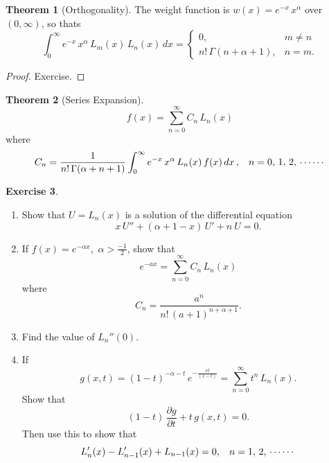 \documentclass[12pt,a4paper]{report}
\theoremstyle{definition}
\newtheorem{thm}{Theorem}[section]
\newtheorem{exe}[thm]{Exercise}
\theoremstyle{plain}
\begin{document}
\begin{thm}[Orthogonality]
The weight function is $w(x) = e^{-x}\, x^{\alpha}$ over $(0,\infty)$, so thats
$$\int_0^{\infty}e^{-x}\, x^{\alpha}\, L_m(x)\, L_n(x)\, dx = \begin{cases}
                                                               0, & m\neq n\\
                                                               n!\, \Gamma(n + \alpha + 1), & n= m.
                                                             \end{cases}$$
\end{thm}

\begin{proof}
Exercise.
\end{proof}







\begin{thm}[Series Expansion]
$$f(x) = \sum_{n=0}^{\infty} C_n\, L_n(x)$$ where $$C_n = \frac{1}{n!\, \Gamma(\alpha + n + 1)}\int_0^{\infty}e^{-x}\, x^{\alpha}\, L_n(x)\, f(x)\, dx\, , \hspace{0.3cm} n=0, \, 1,\, 2, \, \cdots\cdots$$
\end{thm}






\begin{exe}
\begin{enumerate}
\item[(a).] Show that  $U = L_n(x)$ is a solution of the differential equation $$x\, U'' + (\alpha+ 1 - x)\, U' + n\ U = 0.$$
\item[(b).] If $f(x) = e^{-\alpha x}$, $\, \alpha >\frac{-1}{2}$, show that 
$$e^{-a x} = \sum_{n=0}^{\infty} C_n\, L_n(x)$$ where $$C_n = \frac{a^n}{n!\, (a + 1)^{n + \alpha + 1}}.$$
\item[(c).] Find the value of $L_n''(0)$.
\item[(d).] If $$g(x,t) = (1-t)^{-\alpha -t}\, e^{-\frac{xt}{(1-t)}} = \sum_{n=0}^{\infty} t^n\, L_n(x).$$ Show that
$$(1 - t)\, \frac{\partial g}{\partial t} + t\, g(x,t) = 0.$$ Then use this to show that
$$L_n'(x) - L_{n-1}'(x) + L_{n-1}(x) = 0, \hspace{0.3cm} n = 1, \, 2, \, \cdots\cdots$$
\end{enumerate}
\end{exe}
\end{document}
